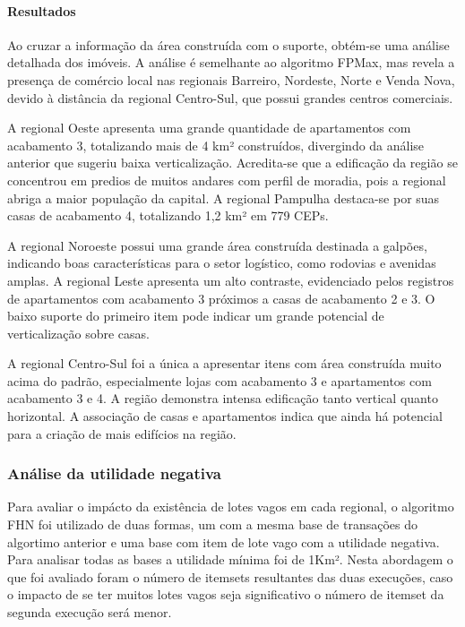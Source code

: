 \documentclass[12pt]{article}
\begin{document}
\paragraph{Resultados}
Ao cruzar a informação da área construída com o suporte, obtém-se uma análise detalhada dos imóveis. A análise é semelhante ao algoritmo FPMax, mas revela a presença de comércio local nas regionais Barreiro, Nordeste, Norte e Venda Nova, devido à distância da regional Centro-Sul, que possui grandes centros comerciais.

A regional Oeste apresenta uma grande quantidade de apartamentos com acabamento 3, totalizando mais de 4 km² construídos, divergindo da análise anterior que sugeriu baixa verticalização. Acredita-se que a edificação da região se concentrou em predios de muitos andares com perfil de moradia, pois a regional abriga a maior população da capital. A regional Pampulha destaca-se por suas casas de acabamento 4, totalizando 1,2 km² em 779 CEPs.

A regional Noroeste possui uma grande área construída destinada a galpões, indicando boas características para o setor logístico, como rodovias e avenidas amplas. A regional Leste apresenta um alto contraste, evidenciado pelos registros de apartamentos com acabamento 3 próximos a casas de acabamento 2 e 3. O baixo suporte do primeiro item pode indicar um grande potencial de verticalização sobre casas.

A regional Centro-Sul foi a única a apresentar itens com área construída muito acima do padrão, especialmente lojas com acabamento 3 e apartamentos com acabamento 3 e 4. A região demonstra intensa edificação tanto vertical quanto horizontal. A associação de casas e apartamentos indica que ainda há potencial para a criação de mais edifícios na região.

 \subsubsection{Análise da utilidade negativa}
Para avaliar o impácto da existência de lotes vagos em cada regional, o algoritmo FHN \cite{fournier2014fhn} foi utilizado de duas formas, um com a mesma base de transações do algortimo anterior e uma base com item de lote vago com a utilidade negativa. Para analisar todas as bases a utilidade mínima foi de 1Km².
Nesta abordagem o que foi avaliado foram o número de itemsets resultantes das duas execuções, caso o impacto de se ter muitos lotes vagos seja significativo o número de itemset da segunda execução será menor.
\end{document}
